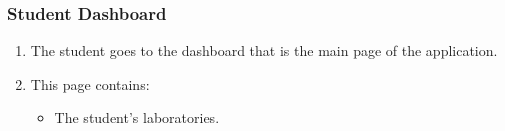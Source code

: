 \subsubsection{Student Dashboard}

\begin{enumerate}
    \item The student goes to the dashboard that is the main page of the application.
    \item This page contains:
    \begin{itemize}
        \item The student's laboratories.
    \end{itemize}
\end{enumerate}
